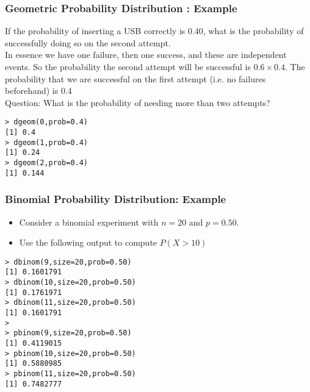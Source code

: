 \documentclass[a4]{beamer}
\begin{document}
\begin{frame}[fragile]
\frametitle{Geometric Probability Distribution : Example}

If the probability of inserting a USB correctly is $0.40$, what is the probability of successfully doing so on the second attempt.\\
\bigskip
In essence we have one failure, then one success, and these are independent events. So the probability the second attempt will be successful is $0.6 \times 0.4$. The probability that we are successful on the first attempt (i.e. no failures beforehand) is 0.4\\
\bigskip
Question: What is the probability of needing more than two attempts?
\begin{verbatim}
> dgeom(0,prob=0.4)
[1] 0.4
> dgeom(1,prob=0.4)
[1] 0.24
> dgeom(2,prob=0.4)
[1] 0.144
\end{verbatim}

\end{frame}




\begin{frame}[fragile]
\frametitle{Binomial Probability Distribution: Example}

\begin{itemize}
\item Consider a binomial experiment with $n = 20$ and $p = 0.50$.
\item Use the following output to compute $P(X > 10)$
\end{itemize}
\begin{verbatim}
> dbinom(9,size=20,prob=0.50)
[1] 0.1601791
> dbinom(10,size=20,prob=0.50)
[1] 0.1761971
> dbinom(11,size=20,prob=0.50)
[1] 0.1601791
>
> pbinom(9,size=20,prob=0.50)
[1] 0.4119015
> pbinom(10,size=20,prob=0.50)
[1] 0.5880985
> pbinom(11,size=20,prob=0.50)
[1] 0.7482777
\end{verbatim}
\end{frame}
\end{document}
